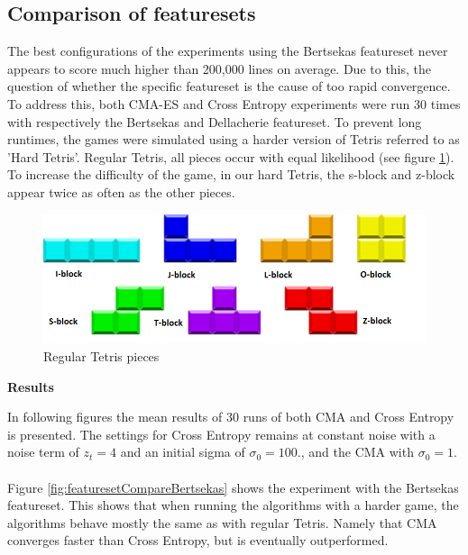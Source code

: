 \subsection{Comparison of featuresets \label{compoffeatureset}}

The best configurations of the experiments using the Bertsekas
featureset never appears to score much higher than 200,000 lines
on average. Due to this, the question of whether the specific featureset
is the cause of too rapid convergence. To address this, both CMA-ES and Cross
Entropy experiments were run 30 times with respectively the Bertsekas and 
Dellacherie featureset. To prevent long runtimes, the games were simulated
using a harder version of Tetris referred to as 'Hard Tetris'. Regular 
Tetris, all pieces occur with equal likelihood (see figure \ref{fig:TetrisPieces}). To increase the difficulty of the game,
in our hard Tetris, the s-block and z-block appear twice as often 
as the other pieces.

\begin{figure}[H]
\begin{center}
\includegraphics[scale=0.6]{img/Pieces}
\end{center}
\caption{Regular Tetris pieces \label{fig:TetrisPieces}}
\end{figure}



\textbf{Results}

In following figures the mean results of 30 runs of both CMA and Cross 
Entropy is presented. The settings for Cross Entropy remains at constant noise
with a noise term of $z_t = 4$ and an initial sigma of $\sigma_0 = 100.$, 
and the CMA with $\sigma_0 = 1$.\\
\\
Figure \ref{fig:featuresetCompareBertsekas} shows the experiment with the 
Bertsekas featureset. This shows that when running the algorithms with a
harder game, the algorithms behave mostly the same as with regular 
Tetris. Namely that CMA converges faster than Cross Entropy, 
but is eventually outperformed.

